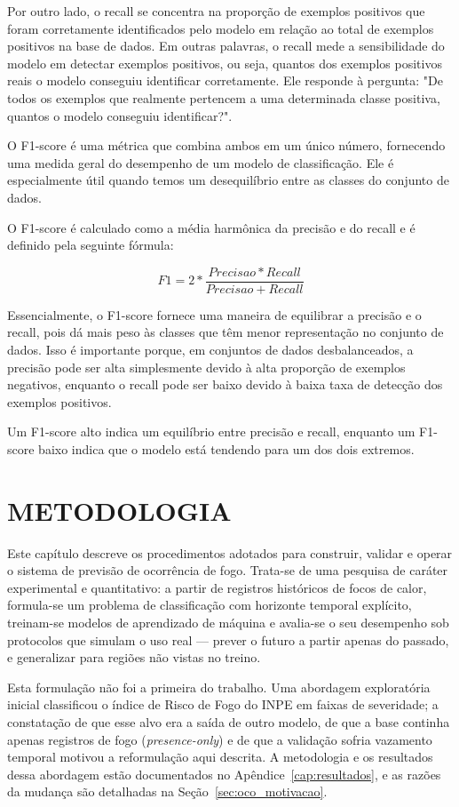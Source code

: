 \documentclass[tcc2]{uftex}
\begin{document}
Por outro lado, o recall se concentra na proporção de exemplos positivos que foram corretamente identificados pelo modelo em relação ao total de exemplos positivos na base de dados. Em outras palavras, o recall mede a sensibilidade do modelo em detectar exemplos positivos, ou seja, quantos dos exemplos positivos reais o modelo conseguiu identificar corretamente. Ele responde à pergunta: "De todos os exemplos que realmente pertencem a uma determinada classe positiva, quantos o modelo conseguiu identificar?".

O F1-score é uma métrica que combina ambos em um único número, fornecendo uma medida geral do desempenho de um modelo de classificação. Ele é especialmente útil quando temos um desequilíbrio entre as classes do conjunto de dados.

O F1-score é calculado como a média harmônica da precisão e do recall e é definido pela seguinte fórmula:

\[
    F1 = 2*\frac{Precisao * Recall}{Precisao+Recall}
\]

Essencialmente, o F1-score fornece uma maneira de equilibrar a precisão e o recall, pois dá mais peso às classes que têm menor representação no conjunto de dados. Isso é importante porque, em conjuntos de dados desbalanceados, a precisão pode ser alta simplesmente devido à alta proporção de exemplos negativos, enquanto o recall pode ser baixo devido à baixa taxa de detecção dos exemplos positivos.

Um F1-score alto indica um equilíbrio entre precisão e recall, enquanto um F1-score baixo indica que o modelo está tendendo para um dos dois extremos.

\chapter{METODOLOGIA}
\label{cap:metodologia}

Este capítulo descreve os procedimentos adotados para construir, validar e operar o sistema de previsão de ocorrência de fogo. Trata-se de uma pesquisa de caráter experimental e quantitativo: a partir de registros históricos de focos de calor, formula-se um problema de classificação com horizonte temporal explícito, treinam-se modelos de aprendizado de máquina e avalia-se o seu desempenho sob protocolos que simulam o uso real --- prever o futuro a partir apenas do passado, e generalizar para regiões não vistas no treino.

Esta formulação não foi a primeira do trabalho. Uma abordagem exploratória inicial classificou o índice de Risco de Fogo do INPE em faixas de severidade; a constatação de que esse alvo era a saída de outro modelo, de que a base continha apenas registros de fogo (\emph{presence-only}) e de que a validação sofria vazamento temporal motivou a reformulação aqui descrita. A metodologia e os resultados dessa abordagem estão documentados no Apêndice~\ref{cap:resultados}, e as razões da mudança são detalhadas na Seção~\ref{sec:oco_motivacao}.
\end{document}
